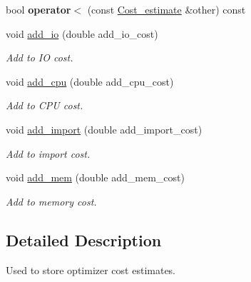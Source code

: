 \begin{DoxyCompactItemize}
\item 
\mbox{\label{classCost__estimate_a8df93dd564aca096004eaf09daa65dac}} 
bool {\bfseries operator$<$} (const \mbox{\hyperlink{classCost__estimate}{Cost\+\_\+estimate}} \&other) const
\item 
\mbox{\label{classCost__estimate_ab06e302ab71f760dd0a106131cfab848}} 
void \mbox{\hyperlink{classCost__estimate_ab06e302ab71f760dd0a106131cfab848}{add\+\_\+io}} (double add\+\_\+io\+\_\+cost)
\begin{DoxyCompactList}\small\item\em Add to IO cost. \end{DoxyCompactList}\item 
\mbox{\label{classCost__estimate_a75d7fd717bdad58c064ee49a0ea03e57}} 
void \mbox{\hyperlink{classCost__estimate_a75d7fd717bdad58c064ee49a0ea03e57}{add\+\_\+cpu}} (double add\+\_\+cpu\+\_\+cost)
\begin{DoxyCompactList}\small\item\em Add to C\+PU cost. \end{DoxyCompactList}\item 
\mbox{\label{classCost__estimate_a32474036e55eefc877555d22f15e01bd}} 
void \mbox{\hyperlink{classCost__estimate_a32474036e55eefc877555d22f15e01bd}{add\+\_\+import}} (double add\+\_\+import\+\_\+cost)
\begin{DoxyCompactList}\small\item\em Add to import cost. \end{DoxyCompactList}\item 
\mbox{\label{classCost__estimate_a87a6d90a85ae340685811f794e10dfe4}} 
void \mbox{\hyperlink{classCost__estimate_a87a6d90a85ae340685811f794e10dfe4}{add\+\_\+mem}} (double add\+\_\+mem\+\_\+cost)
\begin{DoxyCompactList}\small\item\em Add to memory cost. \end{DoxyCompactList}\end{DoxyCompactItemize}


\subsection{Detailed Description}
Used to store optimizer cost estimates.

